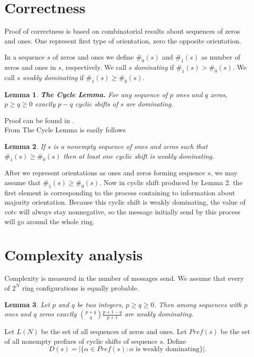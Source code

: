 \documentclass[a4paper,12pt]{article}
\newtheorem{lemma}{Lemma}
\begin{document}
\section{Correctness}
Proof of correctness is based on combinatorial results about sequences of zeros and ones. One represent first type of orientation, zero the opposite orientation.

In a sequence $s$ of zeros and ones we define $\#_0(s)$ and $\#_1(s)$ as number of zeros and ones in $s$, respectively. We call $s$ \textit{dominating} if $\#_1(s) > \#_0(s)$. We call $s$ \textit{weakly dominating} if $\#_1(s) \geq \#_0(s)$.

\begin{lemma}
\textbf{The Cycle Lemma.} For any sequence of $p$ ones and $q$ zeros, $p \geq q \geq 0$ exactly $p-q$ cyclic shifts of $s$ are dominating.
\end{lemma}

Proof can be found in \cite{DERSHOWITZ199035}.\\

From The Cycle Lemma is easily follows

\begin{lemma}
If $s$ is a nonempty sequence of ones and zeros such that $\#_1(s) \geq \#_0(s)$ then at least one cyclic shift is weakly dominating.
\end{lemma}

After we represent orientations as ones and zeros forming sequence $s$, we may assume that $\#_1(s) \geq \#_0(s)$. Now in cyclic shift produced by Lemma 2. the first element is corresponding to the process containing to information about majority orientation. Because this cyclic shift is weakly dominating, the value of $vote$ will always stay nonnegative, so the message initially send by this process will go around the whole ring.

\section{Complexity analysis}
Complexity is measured in the number of messages send. We assume that every of $2^N$ ring configurations is equally probable.

\begin{lemma}
Let $p$ and $q$ be two integers, $p \geq q \geq 0$. Then among sequences with $p$ ones and $q$ zeros exactly ${p+q \choose q} \frac{p+1-q}{p+1}$ are weakly dominating.
\end{lemma}

Let $L(N)$ be the set of all sequences of zeros and ones. Let $Pref(s)$ be the set of all nonempty prefixes of cyclic shifts of sequence $s$. Define
$$D(s) = |\{\alpha \in Pref(s) : \alpha \textrm{ is weakly dominating}\}|.$$
\end{document}
